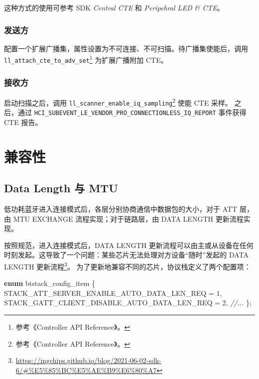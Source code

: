 \documentclass[
  12pt,
]{book}
\newenvironment{Shaded}{\begin{snugshade}}{\end{snugshade}}
\newcommand{\CommentTok}[1]{\textcolor[rgb]{0.56,0.35,0.01}{\textit{#1}}}
\newcommand{\DecValTok}[1]{\textcolor[rgb]{0.00,0.00,0.81}{#1}}
\newcommand{\KeywordTok}[1]{\textcolor[rgb]{0.13,0.29,0.53}{\textbf{#1}}}
\newcommand{\NormalTok}[1]{#1}
\begin{document}
这种方式的使用可参考 SDK \emph{Central CTE} 和 \emph{Peripehral LED \& CTE}。

\hypertarget{ux53d1ux9001ux65b9-2}{%
\subsubsection{发送方}\label{ux53d1ux9001ux65b9-2}}

配置一个扩展广播集，属性设置为不可连接、不可扫描。待广播集使能后，调用 \texttt{ll\_attach\_cte\_to\_adv\_set}\footnote{参考《Controller API Reference》。}
为扩展广播附加 CTE。

\hypertarget{ux63a5ux6536ux65b9-2}{%
\subsubsection{接收方}\label{ux63a5ux6536ux65b9-2}}

启动扫描之后，调用 \texttt{ll\_scanner\_enable\_iq\_sampling}\footnote{参考《Controller API Reference》。} 使能 CTE 采样。
之后，通过 \texttt{HCI\_SUBEVENT\_LE\_VENDOR\_PRO\_CONNECTIONLESS\_IQ\_REPORT} 事件获得 CTE 报告。

\hypertarget{ux517cux5bb9ux6027}{%
\section{兼容性}\label{ux517cux5bb9ux6027}}

\hypertarget{data-length-ux4e0e-mtu}{%
\subsection{Data Length 与 MTU}\label{data-length-ux4e0e-mtu}}

低功耗蓝牙进入连接模式后，各层分别协商通信中数据包的大小，对于 ATT 层，由 MTU EXCHANGE 流程实现；对于链路层，由 DATA LENGTH 更新流程实现。

按照规范，进入连接模式后，DATA LENGTH 更新流程可以由主或从设备在任何时刻发起。这导致了一个问题：某些芯片无法处理对方设备``随时''发起的
DATA LENGTH 更新流程\footnote{\url{https://ingchips.github.io/blog/2021-06-02-sdk-6/\#\%E5\%85\%BC\%E5\%AE\%B9\%E6\%80\%A7}}。
为了更新地兼容不同的芯片，协议栈定义了两个配置项：

\begin{Shaded}
\begin{Highlighting}[]
\KeywordTok{enum}\NormalTok{ btstack_config_item \{}
\NormalTok{    STACK_ATT_SERVER_ENABLE_AUTO_DATA_LEN_REQ = }\DecValTok{1}\NormalTok{,}
\NormalTok{    STACK_GATT_CLIENT_DISABLE_AUTO_DATA_LEN_REQ = }\DecValTok{2}\NormalTok{,}
    \CommentTok{//...}
\NormalTok{\};}
\end{Highlighting}
\end{Shaded}
\end{document}
